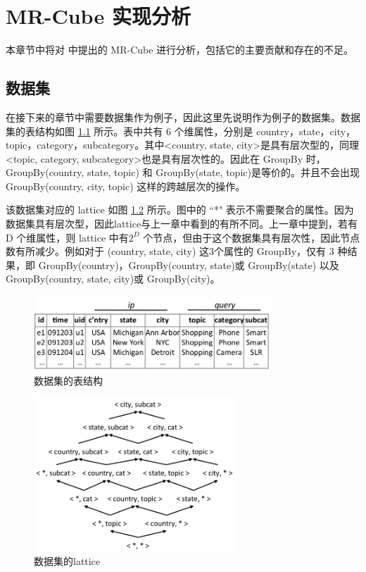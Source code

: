 \chapter{MR-Cube 实现分析}

本章节中将对 \cite{nandi2011distributed} 中提出的 MR-Cube 进行分析，包括它的主要贡献和存在的不足。

\section{数据集}

在接下来的章节中需要数据集作为例子，因此这里先说明作为例子的数据集。数据集的表结构如图 \ref{dataset_table} 所示。表中共有 6 个维属性，分别是 country，state，city，topic，category，subcategory。其中\textless country, state, city\textgreater 是具有层次型的，同理\textless topic, category, subcategory\textgreater 也是具有层次性的。因此在 GroupBy 时，GroupBy(country, state, topic) 和 GroupBy(state, topic)是等价的。并且不会出现 GroupBy(country, city, topic) 这样的跨越层次的操作。

该数据集对应的 lattice 如图 \ref{dataset_lattice} 所示。图中的 ``*" 表示不需要聚合的属性。因为数据集具有层次型，因此lattice与上一章中看到的有所不同。上一章中提到，若有 D 个维属性，则 lattice 中有${2}^{D}$ 个节点，但由于这个数据集具有层次性，因此节点数有所减少。例如对于 (country, state, city) 这3个属性的 GroupBy，仅有 3 种结果，即 GroupBy(country)，GroupBy(country, state)或 GroupBy(state) 以及 GroupBy(country, state, city)或 GroupBy(city)。


\begin{figure}[!htb]
\centering\includegraphics[width=3.5in]{picture/ch_datacube_mr/dataset_table} 
\caption{数据集的表结构}\label{dataset_table} 
\end{figure} 

\begin{figure}[!htb]
\centering\includegraphics[width=3in]{picture/ch_datacube_mr/dataset_lattice} 
\caption{数据集的lattice}\label{dataset_lattice} 
\end{figure} 

